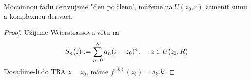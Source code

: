 \begin{note}
Mocninnou řadu derivujeme "člen po členu", můžeme na $U(z_0,r)$ zaměnit sumu a komplexnou derivaci.
\end{note}

\begin{proof}
Užijeme Weierstrassovu větu na 
\[S_n(z):=\sum_{n=0}^N{a_n(z-z_0)^n},\hspace{5mm} z\in{U(z_0,R)}\]
Dosadíme-li do TBA $z=z_0$, máme $f^{(k)}(z_0)={a_k}.{k!}$
\end{proof}